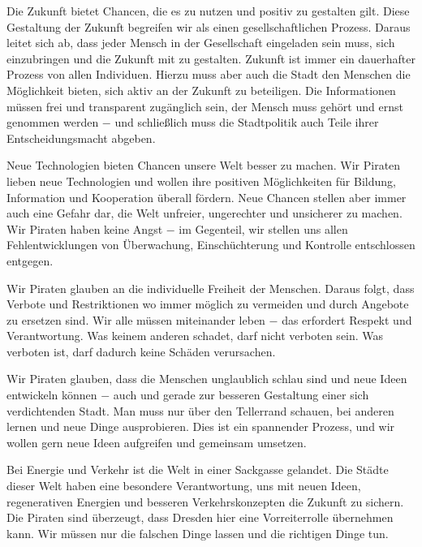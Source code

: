 \documentclass[a4paper, 11pt]{article}
\begin{document}
Die Zukunft bietet Chancen, die es zu nutzen und positiv zu gestalten gilt. Diese Gestaltung der Zukunft begreifen wir als einen gesellschaftlichen Prozess. Daraus leitet sich ab, dass jeder Mensch in der Gesellschaft eingeladen sein muss, sich einzubringen und die Zukunft mit zu gestalten. Zukunft ist immer ein dauerhafter Prozess von allen Individuen. Hierzu muss aber auch die Stadt den Menschen die Möglichkeit bieten, sich aktiv an der Zukunft zu beteiligen. Die Informationen müssen frei und transparent zugänglich sein, der Mensch muss gehört und ernst genommen werden $-$ und schließlich muss die Stadtpolitik auch Teile ihrer Entscheidungsmacht abgeben.\newline
\vspace*{0.25cm}

Neue Technologien bieten Chancen unsere Welt besser zu machen. Wir Piraten lieben neue Technologien und wollen ihre positiven Möglichkeiten für Bildung, Information und Kooperation überall fördern. Neue Chancen stellen aber immer auch eine Gefahr dar, die Welt unfreier, ungerechter und unsicherer zu machen. Wir Piraten haben keine Angst $-$ im Gegenteil, wir stellen uns allen Fehlentwicklungen von Überwachung, Einschüchterung und Kontrolle entschlossen entgegen.\newline
\vspace*{0.25cm}

Wir Piraten glauben an die individuelle Freiheit der Menschen. Daraus folgt, dass Verbote und Restriktionen wo immer möglich zu vermeiden und durch Angebote zu ersetzen sind. Wir alle müssen miteinander leben $-$ das erfordert Respekt und Verantwortung. Was keinem anderen schadet, darf nicht verboten sein. Was verboten ist, darf dadurch keine Schäden verursachen.\newline
\vspace*{0.25cm}

Wir Piraten glauben, dass die Menschen unglaublich schlau sind und neue Ideen entwickeln können $-$ auch und gerade zur besseren Gestaltung einer sich verdichtenden Stadt. Man muss nur über den Tellerrand schauen, bei anderen lernen und neue Dinge ausprobieren. Dies ist ein spannender Prozess, und wir wollen gern neue Ideen aufgreifen und gemeinsam umsetzen.\newline
\newpage

Bei Energie und Verkehr ist die Welt in einer Sackgasse gelandet. Die Städte dieser Welt haben eine besondere Verantwortung, uns mit neuen Ideen, regenerativen Energien und besseren Verkehrskonzepten die Zukunft zu sichern. Die Piraten sind überzeugt, dass Dresden hier eine Vorreiterrolle übernehmen kann. Wir müssen nur die falschen Dinge lassen und die richtigen Dinge tun.\newline
\end{document}
